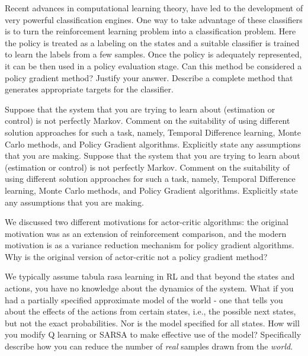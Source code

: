 \documentclass[addpoints,12pt,solution]{exam}
\begin{document}
\begin{questions}
\question[6] Recent advances in computational learning theory, have led to the development of very powerful classification engines. One way to take advantage of these classifiers is to turn the reinforcement learning problem into a classification problem. Here the policy is treated as a labeling on the states and a suitable classifier is trained to learn the labels from a few samples. Once the policy is adequately represented, it can be then used in a policy evaluation stage. Can this method be considered a policy gradient method? Justify your answer. Describe a complete method that generates appropriate targets for the classifier.


\begin{solution}

\end{solution}

\question[5] Suppose that the system that you are trying to learn about (estimation or control) is not perfectly Markov. Comment on the suitability of using different solution approaches for such a task, namely, Temporal Difference learning, Monte Carlo methods, and Policy Gradient algorithms. Explicitly state any assumptions that you are making. Suppose that the system that you are trying to learn about (estimation or control) is not perfectly Markov. Comment on the suitability of using different solution approaches for such a task, namely, Temporal Difference learning, Monte Carlo methods, and Policy Gradient algorithms. Explicitly state any assumptions that you are making.
\begin{solution}
\end{solution}

\question[2] We discussed two different motivations for actor-critic algorithms: the original motivation was as an extension of reinforcement comparison, and the modern motivation is as a variance reduction mechanism for policy gradient algorithms. Why is the original version of actor-critic not a policy gradient method?
\begin{solution}
\end{solution}

\question[5] We typically assume tabula rasa learning in RL and that beyond the states and actions, you have no knowledge about the dynamics of the system. What if you had a partially specified approximate model of the world - one that tells you about the effects of the actions from certain states, i.e., the possible next states, but not the exact probabilities. Nor is the model specified for all states. How will you modify Q learning or SARSA to make effective use of the model? Specifically describe how you can reduce the number of \textit{real} samples drawn from the \textit{world}.
\begin{solution}


\end{solution}
\end{questions}
\end{document}
